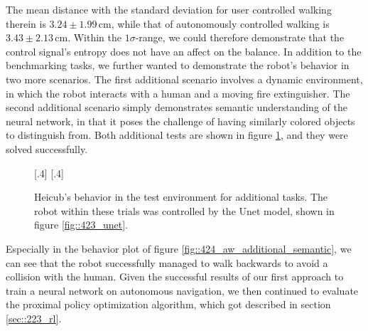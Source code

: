 The mean distance with the standard deviation for user controlled walking therein is $3.24\pm1.99\,\text{cm}$, while that of autonomously controlled walking is $3.43\pm2.13\,\text{cm}$. Within the $1\sigma$-range, we could therefore demonstrate that the control signal's entropy does not have an affect on the balance. In addition to the benchmarking tasks, we further wanted to demonstrate the robot's behavior in two more scenarios. The first additional scenario involves a dynamic environment, in which the robot interacts with a human and a moving fire extinguisher. The second additional scenario simply demonstrates semantic understanding of the neural network, in that it poses the challenge of having similarly colored objects to distinguish from. Both additional tests are shown in figure \ref{fig::424_aw_gif_additional}, and they were solved successfully.
\begin{figure}[h!]
	\centering
	[.4\linewidth]{}
	[.4\linewidth]{}
	\caption{Heicub's behavior in the test environment for additional tasks. The robot within these trials was controlled by the Unet model, shown in figure \ref{fig::423_unet}.}
\label{fig::424_aw_gif_additional}
\end{figure} 
Especially in the behavior plot of figure \ref{fig::424_aw_additional_semantic}, we can see that the robot successfully managed to walk backwards to avoid a collision with the human. Given the successful results of our first approach to train a neural network on autonomous navigation, we then continued to evaluate the proximal policy optimization algorithm, which got described in section \ref{sec::223_rl}.
